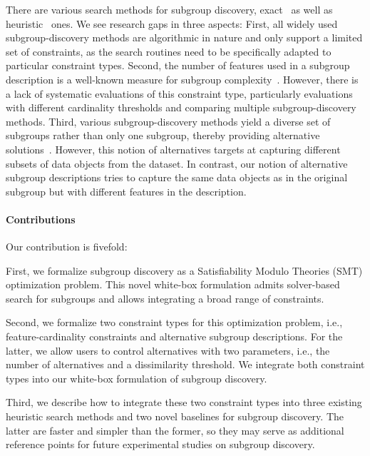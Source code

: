\documentclass{article}
\theoremstyle{definition}
\begin{document}
There are various search methods for subgroup discovery, exact~\cite{atzmueller2006sd, bosc2018anytime, grosskreutz2009subgroup, lemmerich2010fast} as well as heuristic~\cite{friedman1999bump, leeuwen2012diverse, mampaey2012efficient, proencca2022robust} ones.
We see research gaps in three aspects:
First, all widely used subgroup-discovery methods are algorithmic in nature and only support a limited set of constraints, as the search routines need to be specifically adapted to particular constraint types.
Second, the number of features used in a subgroup description is a well-known measure for subgroup complexity~\cite{helal2016subgroup, herrera2011overview, ventura2018subgroup}.
However, there is a lack of systematic evaluations of this constraint type, particularly evaluations with different cardinality thresholds and comparing multiple subgroup-discovery methods.
Third, various subgroup-discovery methods yield a diverse set of subgroups rather than only one subgroup, thereby providing alternative solutions~\cite{belfodil2019fssd, bosc2018anytime, leeuwen2012diverse, lemmerich2010fast, lucas2018ssdp+, proencca2022robust}.
However, this notion of alternatives targets at capturing different subsets of data objects from the dataset.
In contrast, our notion of alternative subgroup descriptions tries to capture the same data objects as in the original subgroup but with different features in the description.

\paragraph{Contributions}

Our contribution is fivefold:

First, we formalize subgroup discovery as a Satisfiability Modulo Theories (SMT) optimization problem.
This novel white-box formulation admits solver-based search for subgroups and allows integrating a broad range of constraints.

Second, we formalize two constraint types for this optimization problem, i.e., feature-cardinality constraints and alternative subgroup descriptions.
For the latter, we allow users to control alternatives with two parameters, i.e., the number of alternatives and a dissimilarity threshold.
We integrate both constraint types into our white-box formulation of subgroup discovery.

Third, we describe how to integrate these two constraint types into three existing heuristic search methods and two novel baselines for subgroup discovery.
The latter are faster and simpler than the former, so they may serve as additional reference points for future experimental studies on subgroup discovery.
\end{document}
